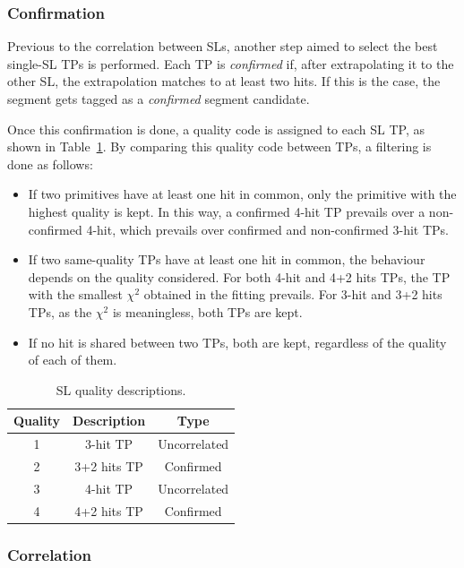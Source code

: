 \documentclass[../main.tex]{subfiles}
\begin{document}
\subsubsection*{Confirmation}

Previous to the correlation between SLs, another step aimed to select the best single-SL TPs is performed. Each TP is \textit{confirmed} if, after extrapolating it to the other SL, the extrapolation matches to at least two hits. If this is the case, the segment gets tagged as a \textit{confirmed} segment candidate.

Once this confirmation is done, a quality code is assigned to each SL TP, as shown in Table~\ref{dts:tab:quality_sl}. By comparing this quality code between TPs, a filtering is done as follows:

\begin{itemize}
\item If two primitives have at least one hit in common, only the primitive with the highest quality is kept. In this way, a confirmed 4-hit TP prevails over a non-confirmed 4-hit, which prevails over confirmed and non-confirmed 3-hit TPs.
\item If two same-quality TPs have at least one hit in common, the behaviour depends on the quality considered. For both 4-hit and 4+2 hits TPs, the TP with the smallest $\chi^2$ obtained in the fitting prevails. For 3-hit and 3+2 hits TPs, as the $\chi^2$ is meaningless, both TPs are kept.
\item If no hit is shared between two TPs, both are kept, regardless of the quality of each of them.
\end{itemize}

\begin{table}[h!]
	\centering
	\begin{tabular}{c|c|c}
		Quality & Description & Type \\\hline
		1 & 3-hit TP & Uncorrelated \\
		2 & 3+2 hits TP & Confirmed \\
		3 & 4-hit TP & Uncorrelated \\
		4 & 4+2 hits TP & Confirmed
	\end{tabular}
	\caption[Superlayer trigger primitives' quality descriptions]{SL quality descriptions.}
	\label{dts:tab:quality_sl}
\end{table}


\subsubsection*{Correlation}
\end{document}
